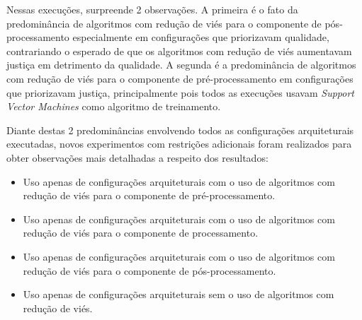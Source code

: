 \documentclass[portugues]{ic-tese}
\begin{document}
\begin{table}[H]
\begin{center}
  \caption{Melhores configurações escolhidas pelo Gerenciador Autonômico \\ Uso dos algoritmos implementados - 25\% Avaliação/75\% \textit{Fairness}}
\label{tbl:ScoreMAPEKGeral2575}
\end{center}
\end{table}

Nessas execuções, surpreende 2 observações. A primeira é o fato da predominância de algoritmos com redução de viés para o componente de pós-processamento especialmente em configurações que priorizavam qualidade, contrariando o esperado de que os algoritmos com redução de viés aumentavam justiça em detrimento da qualidade. A segunda é a predominância de algoritmos com redução de viés para o componente de pré-processamento em configurações que priorizavam justiça, principalmente pois todos as execuções usavam \textit{Support Vector Machines} como algoritmo de treinamento.

Diante destas 2 predominâncias envolvendo todos as configurações arquiteturais executadas, novos experimentos com restrições adicionais foram realizados para obter observações mais detalhadas a respeito dos resultados:

\begin{itemize}
\item Uso apenas de configurações arquiteturais com o uso de algoritmos com redução de viés para o componente de \mbox{pré-processamento}.
\item Uso apenas de configurações arquiteturais com o uso de algoritmos com redução de viés para o componente de \mbox{processamento}.
\item Uso apenas de configurações arquiteturais com o uso de algoritmos com redução de viés para o componente de \mbox{pós-processamento}.
\item Uso apenas de configurações arquiteturais sem o uso de algoritmos com redução de viés.
\end{itemize}
\end{document}
